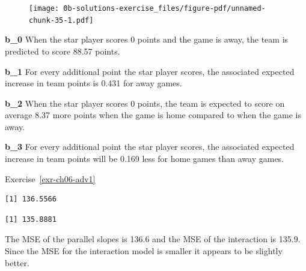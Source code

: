 \documentclass[
  letterpaper,
  DIV=11,
  numbers=noendperiod]{scrreprt}
\newenvironment{Shaded}{\begin{snugshade}}{\end{snugshade}}
\newcommand{\CommentTok}[1]{\textcolor[rgb]{0.37,0.37,0.37}{#1}}
\newcommand{\DecValTok}[1]{\textcolor[rgb]{0.68,0.00,0.00}{#1}}
\newcommand{\FunctionTok}[1]{\textcolor[rgb]{0.28,0.35,0.67}{#1}}
\newcommand{\NormalTok}[1]{\textcolor[rgb]{0.00,0.23,0.31}{#1}}
\newcommand{\SpecialCharTok}[1]{\textcolor[rgb]{0.37,0.37,0.37}{#1}}
\theoremstyle{definition}
\theoremstyle{remark}
\begin{document}
\begin{figure}[H]

{\centering \texttt{[image: 0b-solutions-exercise\_files/figure-pdf/unnamed-chunk-35-1.pdf]}

}

\end{figure}

\textbf{b\_0} When the star player scores 0 points and the game is away,
the team is predicted to score 88.57 points.

\textbf{b\_1} For every additional point the star player scores, the
associated expected increase in team points is 0.431 for away games.

\textbf{b\_2} When the star player scores 0 points, the team is expected
to score on average 8.37 more points when the game is home compared to
when the game is away.

\textbf{b\_3} For every additional point the star player scores, the
associated expected increase in team points will be 0.169 less for home
games than away games.

Exercise~\ref{exr-ch06-adv1}

\begin{Shaded}
\end{Shaded}

\begin{verbatim}
[1] 136.5566
\end{verbatim}

\begin{Shaded}
\end{Shaded}

\begin{verbatim}
[1] 135.8881
\end{verbatim}

The MSE of the parallel slopes is 136.6 and the MSE of the interaction
is 135.9. Since the MSE for the interaction model is smaller it appears
to be slightly better.
\end{document}
